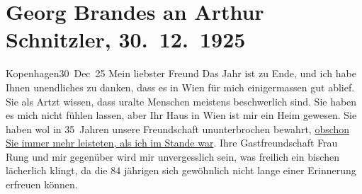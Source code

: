 

         
         \renewcommand{\erwaehntePersonen}{Personen: Georg Brandes, Gertrud Rung}
         \renewcommand{\erwaehnteOrte}{Orte: Kopenhagen, Wien}
         \renewcommand{\erwaehnteWerke}{Werke: Die Frau des Richters. Novelle}
               \section[Georg Brandes an Arthur Schnitzler, 30. 12. 1925]{ Georg Brandes an Arthur Schnitzler, 30. 12. 1925}\nopagebreak{}\rehead{ }\begin{ledgroupsized}[t]{13cm}\normalsize\beginnumbering{} \toendnotes[C]{\smallbreak\pagebreak[2]} 
\pstart
           \raggedleft{}{\pb}Kopenhagen30 Dec 25\pend
           \pstart{}Mein liebster Freund\pend\pstart
           Das Jahr ist zu Ende, und ich habe Ihnen unendliches zu danken, dass es in Wien für mich einigermassen gut ablief. Sie als
               Artzt wissen, dass uralte Menschen meistens beschwerlich sind. Sie haben es mich
               nicht fühlen lassen, aber Ihr Haus in Wien ist mir
               ein Heim gewesen. Sie haben wol in 35 Jahren unsere Freundschaft ununterbrochen
               bewahrt, \uline{obschon Sie immer mehr leisteten, als ich im
                  Stande war}. Ihre Gastfreundschaft Frau Rung und mir {\pb}gegenüber
               wird mir unvergesslich sein, was freilich ein bischen lächerlich klingt, da die 84
               jährigen sich gewöhnlich nicht lange einer Erinnerung erfreuen können.\pend
           \pstart

\end{ledgroupsized}

